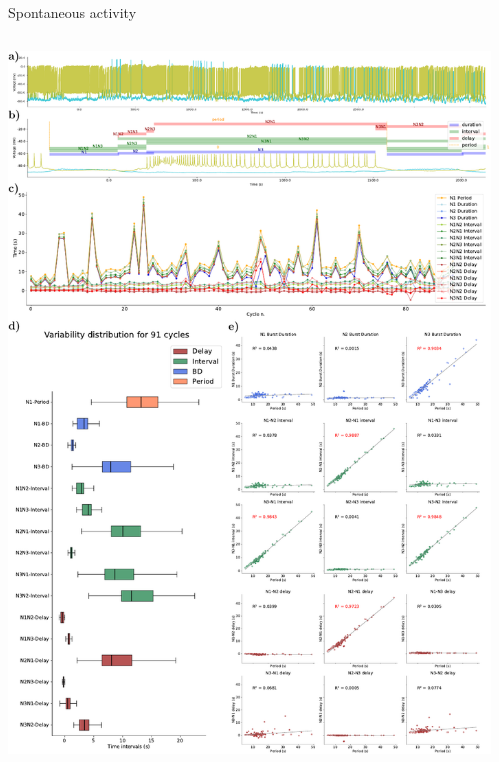 \documentclass[aspectratio=43]{beamer}
\begin{document}
\begin{frame}{Spontaneous activity}
	\begin{columns}
		\begin{column}{0.5\textwidth}
			\includegraphics[width=\textwidth]{invariants/data/SUSSEX/prep2/images/3phases/panel_with_intervals.pdf}
		\end{column}
		\begin{column}{0.5\textwidth}

\end{column}
\end{columns}
\end{frame}
\end{document}
